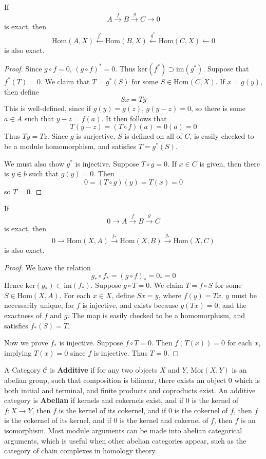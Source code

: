 \begin{theorem}
    If
    \[ A \xrightarrow{f} B \xrightarrow{g} C \xrightarrow{} 0 \]
    is exact, then
    \[ \text{Hom}(A,X) \xleftarrow{f^*} \text{Hom}(B,X) \xleftarrow{g^*} \text{Hom}(C,X) \xleftarrow{} 0 \]
    is also exact.
\end{theorem}
\begin{proof}
    Since $g \circ f = 0$,  $(g \circ f)^* = 0$. Thus $\text{ker}(f^*) \supset \text{im}(g^*)$. Suppose that $f^*(T) = 0$. We claim that $T = g^*(S)$ for some $S \in \text{Hom}(C,X)$. If $x = g(y)$, then define
    \[ Sx = Ty \]
    This is well-defined, since if $g(y) = g(z)$, $g(y - z) = 0$, so there is some $a \in A$ such that $y - z = f(a)$. It then follows that
    \[ T(y - z) = (T \circ f)(a) = 0(a) = 0 \]
    Thus $Ty = Tz$. Since $g$ is surjective, $S$ is defined on all of $C$, is easily checked to be a module homomorphism, and satisfies $T = g^*(S)$.

    We must also show $g^*$ is injective. Suppose $T \circ g = 0$. If $x \in C$ is given, then there is $y \in b$ such that $g(y) = 0$. Then
    \[ 0 = (T \circ g)(y) = T(x) = 0 \]
    so $T = 0$.
\end{proof}

\begin{theorem}
    If
    \[ 0 \xrightarrow{} A \xrightarrow{f} B \xrightarrow{g} C \]
    is exact, then
    \[ 0 \xrightarrow{} \text{Hom}(X,A) \xrightarrow{f_*} \text{Hom}(X,B) \xrightarrow{g_*} \text{Hom}(X,C) \]
    is also exact.
\end{theorem}
\begin{proof}
    We have the relation
    \[ g_* \circ f_* = (g \circ f)_* = 0_* = 0 \]
    Hence $\text{ker}(g_*) \subset \text{im}(f_*)$. Suppose $g \circ T = 0$. We claim $T = f \circ S$ for some $S \in \text{Hom}(X,A)$. For each $x \in X$, define $Sx = y$, where $f(y) = Tx$. $y$ must be necessarily unique, for $f$ is injective, and exists because $g(Tx) = 0$, and the exactness of $f$ and $g$. The map is easily checked to be a homomorphism, and satisfies $f_*(S) = T$.

    Now we prove $f_*$ is injective. Suppose $f \circ T = 0$. Then $f(T(x)) = 0$ for each $x$, implying $T(x) = 0$ since $f$ is injective. Thus $T = 0$.
\end{proof}

A Category $\mathcal{C}$ is {\bf Additive} if for any two objects $X$ and $Y$, $\text{Mor}(X,Y)$ is an abelian group, such that composition is bilinear, there exists an object $0$ which is both initial and terminal, and finite products and coproducts exist. An additive category is {\bf Abelian} if kernels and cokernels exist, and if $0$ is the kernel of $f: X \to Y$, then $f$ is the kernel of its cokernel, and if $0$ is the cokernel of $f$, then $f$ is the cokernel of its kernel, and if $0$ is the kernel and cokernel of $f$, then $f$ is an isomorphism. Most module arguments can be made into abelian categorical arguments, which is useful when other abelian categories appear, such as the category of chain complexes in homology theory.

